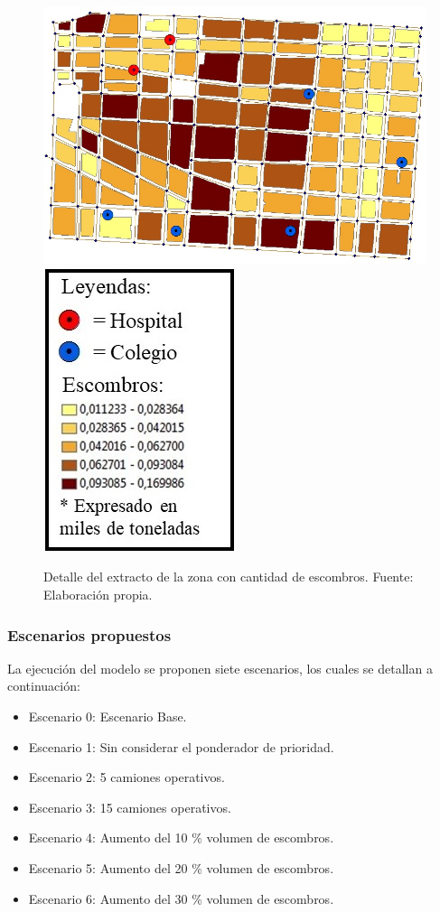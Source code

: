 \documentclass[12pt,a4paper]{article}
\begin{document}
\begin{figure}[h!]
	\centering
	\includegraphics[scale=0.5]{Figuras/mapa1.jpg}
	\includegraphics[scale=0.5]{Figuras/simb3.jpg} 
	\caption{Detalle del extracto de la zona con cantidad de escombros. Fuente: Elaboración propia.}
	\label{fig:fig5}
\end{figure}

\pagebreak

\subsubsection{Escenarios propuestos}

La ejecución del modelo se proponen siete escenarios, los cuales se detallan a continuación:

\begin{itemize}
	\item Escenario 0: Escenario Base.
	\item Escenario 1: Sin considerar el ponderador de prioridad.
	\item Escenario 2: 5 camiones operativos.
	\item Escenario 3: 15 camiones operativos.
	\item Escenario 4: Aumento del 10 \% volumen de escombros.
	\item Escenario 5: Aumento del 20 \% volumen de escombros.
	\item Escenario 6: Aumento del 30 \% volumen de escombros.
\end{itemize}
\end{document}
